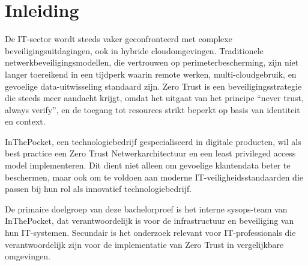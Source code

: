 


% 

\section{Inleiding}%
\label{sec:inleiding}

De IT-sector wordt steeds vaker geconfronteerd met complexe beveiligingsuitdagingen, ook in hybride cloudomgevingen. Traditionele netwerkbeveiligingsmodellen, die vertrouwen op perimeterbescherming, zijn niet langer toereikend in een tijdperk waarin remote werken, multi-cloudgebruik, en gevoelige data-uitwisseling standaard zijn. Zero Trust is een beveiligingsstrategie die steeds meer aandacht krijgt, omdat het uitgaat van het principe “never trust, always verify”, en de toegang tot resources strikt beperkt op basis van identiteit en context.  

InThePocket, een technologiebedrijf gespecialiseerd in digitale producten, wil als best practice een Zero Trust Netwerkarchitectuur en een least privileged access model implementeren. Dit dient niet alleen om gevoelige klantendata beter te beschermen, maar ook om te voldoen aan moderne IT-veiligheidsstandaarden die passen bij hun rol als innovatief technologiebedrijf.  
 
De primaire doelgroep van deze bachelorproef is het interne sysops-team van InThePocket, dat verantwoordelijk is voor de infrastructuur en beveiliging van hun IT-systemen. Secundair is het onderzoek relevant voor IT-professionals die verantwoordelijk zijn voor de implementatie van Zero Trust in vergelijkbare omgevingen.

